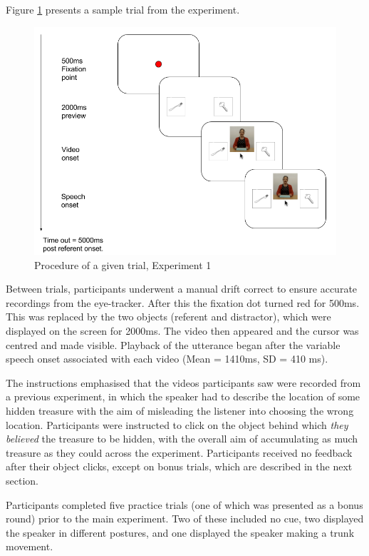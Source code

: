 \documentclass[a4paper,man,natbib]{apa6}
\begin{document}
Figure \ref{fig:v1_trial} presents a sample trial from the experiment. 
\begin{figure}[Ht]
  \centering
	\includegraphics[width=\linewidth]{./img/e7_trial.png}
  \caption{Procedure of a given trial, Experiment 1}
  \label{fig:v1_trial}
\end{figure}
Between trials, participants underwent a manual drift correct to ensure accurate recordings from the eye-tracker.
After this the fixation dot turned red for 500ms. 
This was replaced by the two objects (referent and distractor), which were displayed on the screen for 2000ms.
The video then appeared and the cursor was centred and made visible.
Playback of the utterance began after the variable speech onset associated with each video (Mean = 1410ms, SD = 410 ms). 

The instructions emphasised that the videos participants saw were recorded from a previous experiment, in which the speaker had to describe the location of some hidden treasure with the aim of misleading the listener into choosing the wrong location.
Participants were instructed to click on the object behind which \textit{they believed} the treasure to be hidden, with the overall aim of accumulating as much treasure as they could across the experiment.
Participants received no feedback after their object clicks, except on bonus trials, which are described in the next section.

Participants completed five practice trials (one of which was presented as a bonus round) prior to the main experiment. 
Two of these included no cue, two displayed the speaker in different postures, and one displayed the speaker making a trunk movement.
\end{document}
